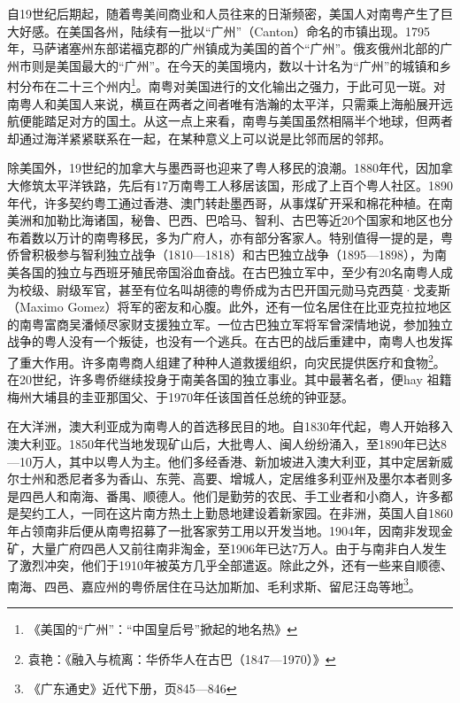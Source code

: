 自19世纪后期起，随着粤美间商业和人员往来的日渐频密，美国人对南粤产生了巨大好感。在美国各州，陆续有一批以“广州”（Canton）命名的市镇出现。1795年，马萨诸塞州东部诺福克郡的广州镇成为美国的首个“广州”。俄亥俄州北部的广州市则是美国最大的“广州”。在今天的美国境内，数以十计名为“广州”的城镇和乡村分布在二十三个州内\footnote{《美国的“广州”：“中国皇后号”掀起的地名热》}。南粤对美国进行的文化输出之强力，于此可见一斑。对南粤人和美国人来说，横亘在两者之间者唯有浩瀚的太平洋，只需乘上海船展开远航便能踏足对方的国土。从这一点上来看，南粤与美国虽然相隔半个地球，但两者却通过海洋紧紧联系在一起，在某种意义上可以说是比邻而居的邻邦。

除美国外，19世纪的加拿大与墨西哥也迎来了粤人移民的浪潮。1880年代，因加拿大修筑太平洋铁路，先后有17万南粤工人移居该国，形成了上百个粤人社区。1890年代，许多契约粤工通过香港、澳门转赴墨西哥，从事煤矿开采和棉花种植。在南美洲和加勒比海诸国，秘鲁、巴西、巴哈马、智利、古巴等近20个国家和地区也分布着数以万计的南粤移民，多为广府人，亦有部分客家人。特别值得一提的是，粤侨曾积极参与智利独立战争（1810—1818）和古巴独立战争（1895—1898），为南美各国的独立与西班牙殖民帝国浴血奋战。在古巴独立军中，至少有20名南粤人成为校级、尉级军官，甚至有位名叫胡德的粤侨成为古巴开国元勋马克西莫·戈麦斯（Maximo Gomez）将军的密友和心腹。此外，还有一位名居住在比亚克拉拉地区的南粤富商吴潘倾尽家财支援独立军。一位古巴独立军将军曾深情地说，参加独立战争的粤人没有一个叛徒，也没有一个逃兵。在古巴的战后重建中，南粤人也发挥了重大作用。许多南粤商人组建了种种人道救援组织，向灾民提供医疗和食物\footnote{袁艳：《融入与梳离：华侨华人在古巴（1847—1970）》}。在20世纪，许多粤侨继续投身于南美各国的独立事业。其中最著名者，便hay 祖籍梅州大埔县的圭亚那国父、于1970年任该国首任总统的钟亚瑟。

在大洋洲，澳大利亚成为南粤人的首选移民目的地。自1830年代起，粤人开始移入澳大利亚。1850年代当地发现矿山后，大批粤人、闽人纷纷涌入，至1890年已达8—10万人，其中以粤人为主。他们多经香港、新加坡进入澳大利亚，其中定居新威尔士州和悉尼者多为香山、东莞、高要、增城人，定居维多利亚州及墨尔本者则多是四邑人和南海、番禺、顺德人。他们是勤劳的农民、手工业者和小商人，许多都是契约工人，一同在这片南方热土上勤恳地建设着新家园。在非洲，英国人自1860年占领南非后便从南粤招募了一批客家劳工用以开发当地。1904年，因南非发现金矿，大量广府四邑人又前往南非淘金，至1906年已达7万人。由于与南非白人发生了激烈冲突，他们于1910年被英方几乎全部遣返。除此之外，还有一些来自顺德、南海、四邑、嘉应州的粤侨居住在马达加斯加、毛利求斯、留尼汪岛等地\footnote{《广东通史》近代下册，页845—846}。

